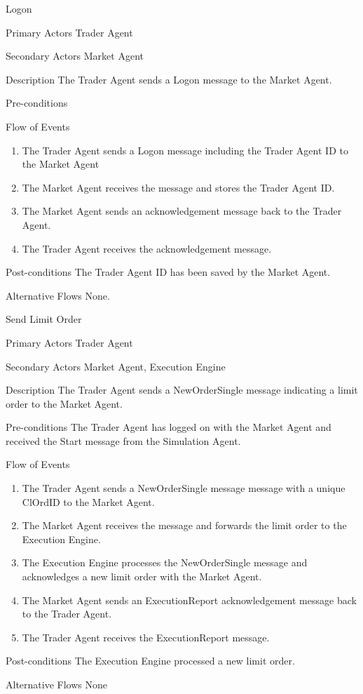 \begin{usecase}{Logon}
\item[Primary Actors] Trader Agent
\item[Secondary Actors] Market Agent
\item[Description] The Trader Agent sends a Logon message to the Market Agent.
\item[Pre-conditions] 
\item[Flow of Events] 
\begin{enumerate}
\item The Trader Agent sends a Logon message including the Trader Agent ID to the Market Agent
\item The Market Agent receives the message and stores the Trader Agent ID.
\item The Market Agent sends an acknowledgement message back to the Trader Agent.
\item The Trader Agent receives the acknowledgement message.
\end{enumerate}
\item[Post-conditions] The Trader Agent ID has been saved by the Market Agent. 
\item[Alternative Flows] None.
\end{usecase}
  
\begin{usecase}{Send Limit Order}
\item[Primary Actors] Trader Agent
\item[Secondary Actors] Market Agent, Execution Engine
\item[Description] The Trader Agent sends a NewOrderSingle message indicating a limit order to the Market Agent.
\item[Pre-conditions] The Trader Agent has logged on with the Market Agent and received the Start message from the Simulation Agent.
\item[Flow of Events] 
\begin{enumerate}
\item The Trader Agent sends a NewOrderSingle message message with a unique ClOrdID to the Market Agent.
\item The Market Agent receives the message and forwards the limit order to the Execution Engine.
\item The Execution Engine processes the NewOrderSingle message and acknowledges a new limit order with the Market Agent.
\item The Market Agent sends an ExecutionReport acknowledgement message back to the Trader Agent.
\item The Trader Agent receives the ExecutionReport message.
\end{enumerate}
\item[Post-conditions] The Execution Engine processed a new limit order.
\item[Alternative Flows] None
\end{usecase}

